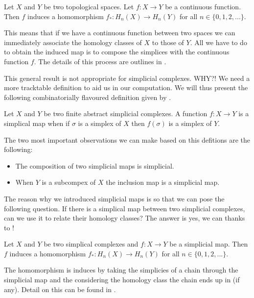 \begin{defn} Let $X$ and $Y$ be two topological spaces. Let $f: X \to Y$ be a continuous function. Then $f$ induces a homomorphism $f_*: H_n(X) \to H_n(Y)$ for all $n \in \{0, 1, 2, ...\}$. \end{defn}

This means that if we have a continuous function between two spaces we can immediately associate the homology classes of $X$ to those of $Y$. All we have to do to obtain the induced map is to compose the simplices with the continuous function $f$. The details of this process are outlines in \cite{algebraic-topology}.


This general result is not appropriate for simplicial complexes. WHY?! We need a more tracktable definition to aid us in our computation. We will thus present the following combinatorially flavoured definition given by \cite{combinatorial-algebraic-topology}. 


\begin{defn} Let $X$ and $Y$ be two finite abstract simplicial complexes. A function $f: X \to Y$ is a simplical map when if $\sigma$ is a simplex of $X$ then $f(\sigma)$ is a simplex of $Y$. \end{defn}

The two most important observations we can make based on this defitions are the following:

\begin{itemize}
    \item The composition of two simplicial maps is simplicial.
    \item When $Y$ is a subcompex of $X$ the inclusion map is a simplicial map.
\end{itemize}


The reason why we introduced simplicial maps is so that we can pose the following question. If there is a simplical map between two simplicial complexes, can we use it to relate their homology classes? The answer is yes, we can thanks to \cite{combinatorial-algebraic-topology}!



\begin{defn} Let $X$ and $Y$ be two simplical complexes and $f: X \to Y$ be a simplicial map. Then $f$ induces a homomorphism $f_*: H_n(X) \to H_n(Y)$ for all $n \in \{0, 1, 2, ...\}$. \end{defn}

The homomorphism is induces by taking the simplicies of a chain through the simplicial map and the considering the homology class the chain ends up in (if any). Detail on this can be found in \cite{combinatorial-algebraic-topology}.

